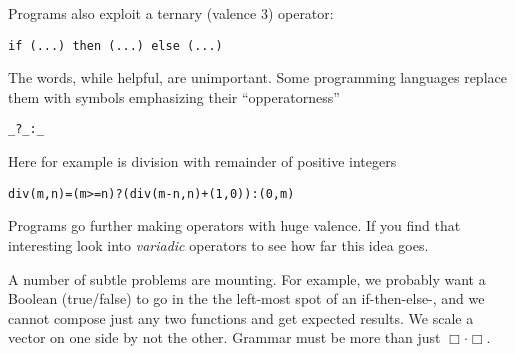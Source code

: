 Programs also exploit a ternary (valence 3) operator:
\begin{center}
    \lstinline[language=Sava]{if (...) then (...) else (...)}
\end{center}
The words, while helpful, are unimportant.  Some programming languages 
replace them with symbols emphasizing their ``opperatorness'' 
\begin{center}
    \lstinline[language=Sava]{_?_:_}
\end{center}
Here for example is division with remainder of positive integers
\begin{center}
\begin{lstlisting}[language=Sava,mathescape]
div(m,n)=(m>=n)?(div(m-n,n)+(1,0)):(0,m)
\end{lstlisting}
\end{center}
Programs go further making operators with huge valence.
If you find that interesting look into \emph{variadic} operators to see how 
far this idea goes.


A number of subtle problems are 
mounting.  For example, we probably want a Boolean (true/false) to 
go in the the left-most spot of an if-then-else-, and we cannot compose 
just any two functions and get expected results.  We scale a vector on one side 
by not the other.  Grammar must be more than just $\Box\cdot \Box$.

